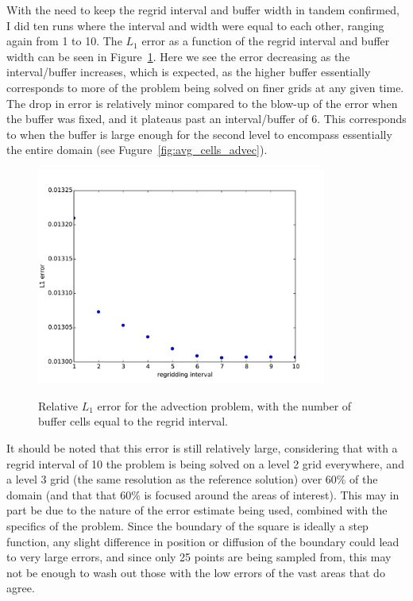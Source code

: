 \documentclass[11pt]{article}
\begin{document}
With the need to keep the regrid interval and buffer width in tandem confirmed,
I did ten runs where the interval and width were equal to each other,
ranging again from 1 to 10. The $L_1$ error as a function of the regrid interval
and buffer width can be seen in Figure~\ref{fig:err_advec}. Here we see the
error decreasing as the interval/buffer increases, which is expected, as the
higher buffer essentially corresponds to more of the problem being solved on
finer grids at any given time. The drop in error is relatively minor compared
to the blow-up of the error when the buffer was fixed, and it plateaus past 
an interval/buffer of 6. This corresponds to when the buffer is large enough
for the second level to encompass essentially the entire domain (see 
Fugure~\ref{fig:avg_cells_advec}).

\begin{figure}[!htb]
\centering
\caption{Relative $L_1$ error for the advection problem, with the number of
buffer cells equal to the regrid interval.}
\includegraphics[width=0.85\textwidth]{myclaw/l1_err_advec}
\label{fig:err_advec}
\end{figure}

It should be noted that this error is still relatively large, considering
that with a regrid interval of 10 the problem is being solved on a level 2
grid everywhere, and a level 3 grid (the same resolution as the reference 
solution) over 60\% of the domain (and that that 60\% is focused around
the areas of interest). This may in part be due to the nature of the error
estimate being used, combined with the specifics of the problem. Since the
boundary of the square is ideally a step function, any slight difference
in position or diffusion of the boundary could lead to very large errors,
and since only 25 points are being sampled from, this may not be enough to 
wash out those with the low errors of the vast areas that do agree.
\end{document}
